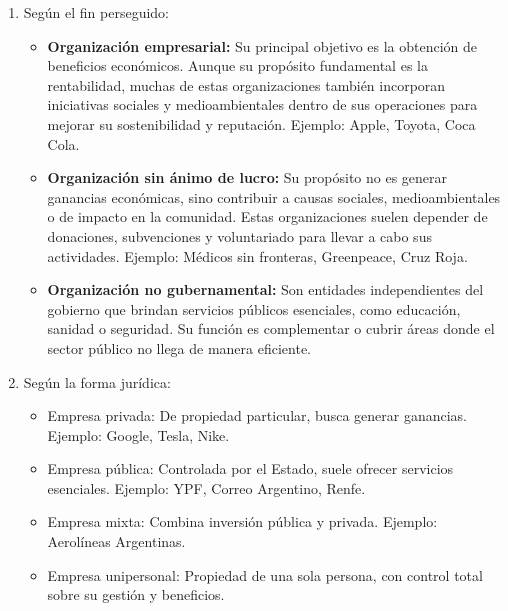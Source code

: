 \documentclass[a4paper,oneside,11pt]{article}
\begin{document}
\begin{enumerate}
    \item Según el fin perseguido:
        \begin{itemize}
            \item \textbf{Organización empresarial:} Su principal objetivo es la obtención de beneficios económicos. Aunque su propósito fundamental es la rentabilidad, muchas de estas organizaciones también incorporan iniciativas sociales y medioambientales dentro de sus operaciones para mejorar su sostenibilidad y reputación. Ejemplo: Apple, Toyota, Coca Cola.
            \item \textbf{Organización sin ánimo de lucro:} Su propósito no es generar ganancias económicas, sino contribuir a causas sociales, medioambientales o de impacto en la comunidad. Estas organizaciones suelen depender de donaciones, subvenciones y voluntariado para llevar a cabo sus actividades. Ejemplo: Médicos sin fronteras, Greenpeace, Cruz Roja.
            \item \textbf{Organización no gubernamental:} Son entidades independientes del gobierno que brindan servicios públicos esenciales, como educación, sanidad o seguridad. Su función es complementar o cubrir áreas donde el sector público no llega de manera eficiente. 
        \end{itemize}

    \item Según la forma jurídica:
        \begin{itemize}
            \item Empresa privada: De propiedad particular, busca generar ganancias. Ejemplo: Google, Tesla, Nike.
            \item Empresa pública: Controlada por el Estado, suele ofrecer servicios esenciales. Ejemplo: YPF, Correo Argentino, Renfe.
            \item Empresa mixta: Combina inversión pública y privada. Ejemplo: Aerolíneas Argentinas.
            \item Empresa unipersonal: Propiedad de una sola persona, con control total sobre su gestión y beneficios.
        \end{itemize}


\end{enumerate}
\end{document}
